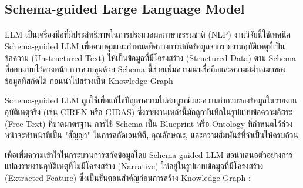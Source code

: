 \subsection{Schema-guided Large Language Model}\label{sec:sgLLM}
\paragraph{}
LLM เป็นเครื่องมือที่มีประสิทธิภาพในการประมวลผลภาษาธรรมชาติ (NLP) \cite{khot2024prompting} งานวิจัยนี้ใช้เทคนิค Schema-guided LLM เพื่อควบคุมและกำหนดทิศทางการสกัดข้อมูลจากรายงานอุบัติเหตุที่เป็นข้อความ (Unstructured Text) ให้เป็นข้อมูลที่มีโครงสร้าง (Structured Data) ตาม Schema ที่ออกแบบไว้ล่วงหน้า \cite{liyan2022analysis} การควบคุมด้วย Schema นี้ช่วยเพิ่มความน่าเชื่อถือและความสม่ำเสมอของข้อมูลที่สกัดได้ ก่อนนำไปสร้างเป็น Knowledge Graph \cite{liyan2022analysis}

Schema-guided LLM ถูกใช้เพื่อแก้ไขปัญหาความไม่สมบูรณ์และความกำกวมของข้อมูลในรายงานอุบัติเหตุจริง (เช่น CIREN หรือ GIDAS) \cite{nhtsa_ciren, gidas_study} ซึ่งรายงานเหล่านี้มักถูกบันทึกในรูปแบบข้อความอิสระ (Free Text) ที่ขาดมาตรฐาน การใช้ Schema เป็น Blueprint หรือ Ontology ที่กำหนดไว้ล่วงหน้าจะทำหน้าที่เป็น "สัญญา" ในการสกัดเอนทิตี, คุณลักษณะ, และความสัมพันธ์ที่จำเป็นให้ครบถ้วน

เพื่อเพิ่มความเข้าใจในกระบวนการสกัดข้อมูลโดย Schema-guided LLM ขอนำเสนอตัวอย่างการแปลงรายงานอุบัติเหตุที่ไม่มีโครงสร้าง (Narrative) ให้อยู่ในรูปแบบข้อมูลที่มีโครงสร้าง (Extracted Feature) ซึ่งเป็นขั้นตอนสำคัญก่อนการสร้าง Knowledge Graph \cite{bagschik2018ontology}:

